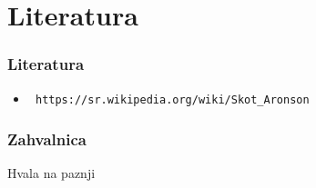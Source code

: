 \documentclass{beamer}
\begin{document}
\section{Literatura}
\begin{frame}[fragile]\frametitle{Literatura}
	\begin{itemize}
	\item \begin{verbatim} https://sr.wikipedia.org/wiki/Skot_Aronson \end{verbatim}
	\end{itemize}
\end{frame}

\begin{frame}[fragile]\frametitle{Zahvalnica}
	\thispagestyle{empty}
	\begin{center}
		{\Huge Hvala na paznji}
	\end{center}	
\end{frame}

		


			

		
\end{document}
